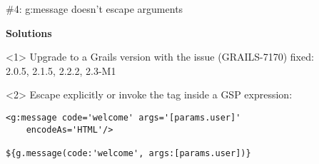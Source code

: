\begin{frame}

  \vspace{.5cm}

  \begin{center}
    \Huge\color{red} \#4: g:message doesn't escape arguments
  \end{center}

  \vspace{1cm}

    \Large
    \textbf{Solutions} \\[1em]

    \begin{onlyenv}<1>
      Upgrade to a Grails version with the issue (GRAILS-7170) fixed: \\[1em]
      2.0.5, 2.1.5, 2.2.2, 2.3-M1
    \end{onlyenv}

    \begin{onlyenv}<2>
      Escape explicitly or invoke the tag inside a GSP expression:
      \begin{center}
        \begin{minipage}{.9\textwidth}
          \begin{verbatim}
<g:message code='welcome' args='[params.user]'
    encodeAs='HTML'/>

${g.message(code:'welcome', args:[params.user])}
          \end{verbatim}
        \end{minipage}
      \end{center}
    \end{onlyenv}

    \vfill

\end{frame}



